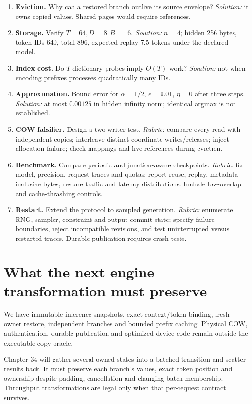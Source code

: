 \begin{enumerate}
 \emph{Solution:} zero can mean an initial-state checkpoint or no hit.
\item \textbf{Eviction.} Why can a restored branch outlive its source envelope?
 \emph{Solution:} it owns copied values. Shared pages would require references.
\item \textbf{Storage.} Verify $T=64,D=8,B=16$.
 \emph{Solution:} $n=4$; hidden 256 bytes, token IDs 640, total 896,
 expected replay 7.5 tokens under the declared model.
\item \textbf{Index cost.} Do $T$ dictionary probes imply $O(T)$ work?
 \emph{Solution:} not when encoding prefixes processes quadratically many IDs.
\item \textbf{Approximation.} Bound error for $\alpha=1/2$, $\epsilon=0.01$,
 $\eta=0$ after three steps. \emph{Solution:} at most $0.00125$ in hidden
 infinity norm; identical argmax is not established.
\item \textbf{COW falsifier.} Design a two-writer test.
 \emph{Rubric:} compare every read with independent copies; interleave distinct
 coordinate writes/releases; inject allocation failure; check mappings and
 live references during eviction.
\item \textbf{Benchmark.} Compare periodic and junction-aware checkpoints.
 \emph{Rubric:} fix model, precision, request traces and quotas; report reuse,
 replay, metadata-inclusive bytes, restore traffic and latency distributions.
 Include low-overlap and cache-thrashing controls.
\item \textbf{Restart.} Extend the protocol to sampled generation.
 \emph{Rubric:} enumerate RNG, sampler, constraint and output-commit state; specify
 failure boundaries, reject incompatible revisions, and test uninterrupted
 versus restarted traces. Durable publication requires crash tests.
\end{enumerate}

\section{What the next engine transformation must preserve}

We have immutable inference snapshots, exact context/token binding,
fresh-owner restore, independent branches and bounded prefix caching.
Physical COW, authentication, durable publication and optimized device code
remain outside the executable copy oracle.

Chapter 34 will gather several owned states into a batched transition and
scatter results back. It must preserve each branch's values, exact token
position and ownership despite padding, cancellation and changing batch
membership. Throughput transformations are legal only when that per-request
contract survives.

